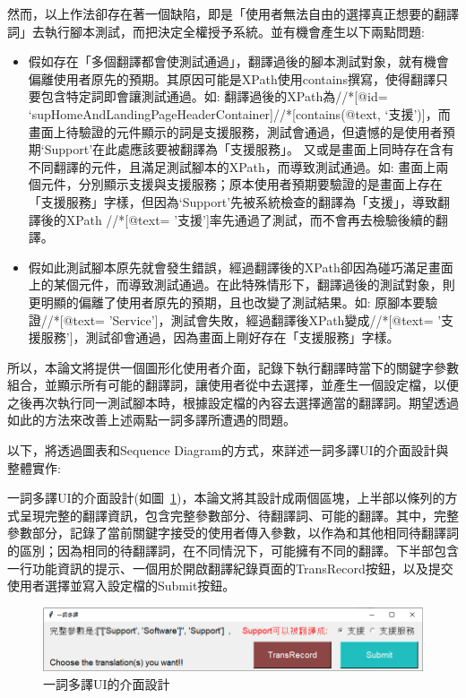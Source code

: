 然而，以上作法卻存在著一個缺陷，即是「使用者無法自由的選擇真正想要的翻譯詞」去執行腳本測試，而把決定全權授予系統。並有機會產生以下兩點問題:
\begin{itemize}
\item[1.]假如存在「多個翻譯都會使測試通過」，翻譯過後的腳本測試對象，就有機會偏離使用者原先的預期。其原因可能是XPath使用contains撰寫，使得翻譯只要包含特定詞即會讓測試通過。如: 翻譯過後的XPath為//*[@id= ‘supHomeAndLandingPageHeaderContainer]//*[contains(@text, ‘支援’)]，而畫面上待驗證的元件顯示的詞是支援服務，測試會通過，但遺憾的是使用者預期‘Support’在此處應該要被翻譯為「支援服務」。
         又或是畫面上同時存在含有不同翻譯的元件，且滿足測試腳本的XPath，而導致測試通過。如: 畫面上兩個元件，分別顯示支援與支援服務；原本使用者預期要驗證的是畫面上存在「支援服務」字樣，但因為‘Support’先被系統檢查的翻譯為「支援」，導致翻譯後的XPath //*[@text= '支援']率先通過了測試，而不會再去檢驗後續的翻譯。 
\item[2.]假如此測試腳本原先就會發生錯誤，經過翻譯後的XPath卻因為碰巧滿足畫面上的某個元件，而導致測試通過。在此特殊情形下，翻譯過後的測試對象，則更明顯的偏離了使用者原先的預期，且也改變了測試結果。如: 原腳本要驗證//*[@text= 'Service']，測試會失敗，經過翻譯後XPath變成//*[@text= '支援服務']，測試卻會通過，因為畫面上剛好存在「支援服務」字樣。
\end{itemize}

所以，本論文將提供一個圖形化使用者介面，記錄下執行翻譯時當下的關鍵字參數組合，並顯示所有可能的翻譯詞，讓使用者從中去選擇，並產生一個設定檔，以便之後再次執行同一測試腳本時，根據設定檔的內容去選擇適當的翻譯詞。期望透過如此的方法來改善上述兩點一詞多譯所遭遇的問題。

以下，將透過圖表和Sequence Diagram的方式，來詳述一詞多譯UI的介面設計與整體實作:

一詞多譯UI的介面設計(如圖~\ref{一詞多譯UI的介面設計})，本論文將其設計成兩個區塊，上半部以條列的方式呈現完整的翻譯資訊，包含完整參數部分、待翻譯詞、可能的翻譯。其中，完整參數部分，記錄了當前關鍵字接受的使用者傳入參數，以作為和其他相同待翻譯詞的區別；因為相同的待翻譯詞，在不同情況下，可能擁有不同的翻譯。下半部包含一行功能資訊的提示、一個用於開啟翻譯紀錄頁面的TransRecord按鈕，以及提交使用者選擇並寫入設定檔的Submit按鈕。
\begin{figure}[H]
    \includegraphics[width= \textwidth]{../論文截圖/3-4-1一詞多譯UI介面設計.png}
    \caption{一詞多譯UI的介面設計}
    \label{一詞多譯UI的介面設計}
\end{figure}

